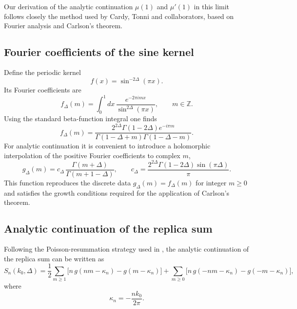 \documentclass[11pt]{article}
\begin{document}
Our derivation of the analytic continuation $\mu(1)$ and $\mu'(1)$ in this limit follows closely the
method used by Cardy, Tonni and collaborators\cite{calabrese2011entanglement}, based on Fourier analysis
and Carlson's theorem.

\subsection{Fourier coefficients of the sine kernel}

Define the periodic kernel
\begin{equation}
f(x)=\sin^{-2\Delta}(\pi x).
\end{equation}
Its Fourier coefficients are
\begin{equation}
f_\Delta(m)=\int_0^1 dx\,\frac{e^{-2\pi i m x}}{\sin^{2\Delta}(\pi x)},
\qquad m\in\mathbb Z .
\end{equation}
Using the standard beta-function integral one finds
\begin{equation}
f_\Delta(m)=
\frac{2^{2\Delta}\Gamma(1-2\Delta)e^{-i\pi m}}
{\Gamma(1-\Delta+m)\Gamma(1-\Delta-m)} .
\end{equation}
For analytic continuation it is convenient to introduce a holomorphic
interpolation of the positive Fourier coefficients to complex $m$,
\begin{equation}\label{eq: Fourier coeff of csc^2Delta}
g_\Delta(m)=c_\Delta\,\frac{\Gamma(m+\Delta)}{\Gamma(m+1-\Delta)},
\qquad
c_\Delta=\frac{2^{2\Delta}\Gamma(1-2\Delta)\sin(\pi\Delta)}{\pi}.
\end{equation}
This function reproduces the discrete data
\(
g_\Delta(m)=f_\Delta(m)
\)
for integer $m\ge0$ and satisfies the growth conditions required for the
application of Carlson's theorem.

\subsection{Analytic continuation of the replica sum}

Following the Poisson-resummation strategy used in
\cite{calabrese2011entanglement}, the analytic continuation of the replica sum can be
written as
\begin{equation}
S_n(k_0,\Delta)=
\frac{1}{2}\sum_{m\ge1}\big[n\,g(nm-\kappa_n)-g(m-\kappa_n)\big]
+
\sum_{m\ge0}\big[n\,g(-nm-\kappa_n)-g(-m-\kappa_n)\big],
\end{equation}
where
\begin{equation}
\kappa_n=-\frac{n k_0}{2\pi}.
\end{equation}
\end{document}
